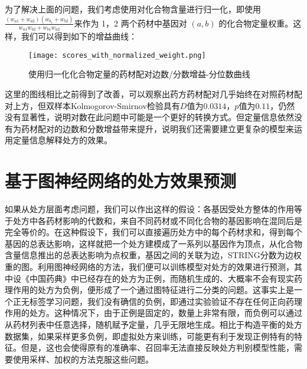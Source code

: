 为了解决上面的问题，我们考虑使用对化合物含量进行归一化，即使用 $\frac{(w_{a1}+w_{a2})(w_{b_1}+w_{b2})}{w_{a1}w_{b2}+w_{b1}w_{a2}}$来作为 1，2 两个药材中基因对 $(a, b)$ 的化合物定量权重。这样，我们可以得到如下的增益曲线：

\begin{figure}[H]
  \centering
  \texttt{[image: scores\_with\_normalized\_weight.png]}
  \caption{使用归一化化合物定量的药材配对边数/分数增益-分位数曲线}
  \label{fig:scores_with_normalized_weight}
\end{figure}

这里的图线相比之前得到了改善，可以观察出药方药材配对几乎始终在对照药材配对上方，但双样本Kolmogorov-Smirnov检验具有$D$值为$0.0314$，$p$值为$0.11$，仍然没有显著性，说明对数在此问题中可能是一个更好的转换方式。但定量信息依然没有为药材配对的边数和分数增益带来提升，说明我们还需要建立更复杂的模型来运用定量信息解释处方的效果。


\section{基于图神经网络的处方效果预测}

如果从处方层面考虑问题，我们可以作出这样的假设：各基因受处方整体的作用等于处方中各药材影响的代数和，来自不同药材或不同化合物的基因影响在混同后是完全等价的。在这种假设下，我们可以直接遍历处方中的每个药材求和，得到每个基因的总表达影响，这样就把一个处方建模成了一系列以基因作为顶点，从化合物含量信息推出的总表达影响为点权重，基因之间的关联为边，STRING分数为边权重的图。利用图神经网络的方法，我们便可以训练模型对处方的效果进行预测，其中设《中国药典》中已经存在的处方为正例，而随机生成的、大概率不会有现实药理作用的处方为负例，便形成了一个通过图特征进行二分类的问题。这事实上是一个正无标签学习问题，我们没有确信的负例，即通过实验验证不存在任何正向药理作用的处方。这种情况下，由于正例是固定的，数量上非常有限，而负例可以通过从药材列表中任意选择，随机赋予定量，几乎无限地生成。相比于构造平衡的处方数据集，如果采样更多负例，即虚拟处方来训练，可能更有利于发现正例特有的特征。但是，这也会使得原有的准确率、召回率无法直接反映处方判别模型性能，需要使用采样、加权的方法克服这些问题。

